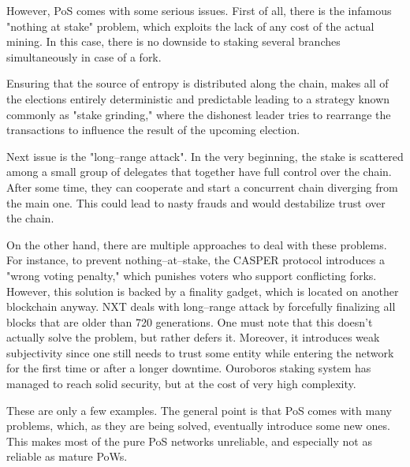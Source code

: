 However, PoS comes with some serious issues. First of all, there is the infamous "nothing at stake"
\cite{pos_flaws_nothing}
problem, which exploits the lack of any cost of the actual mining. In this case,
there is no downside to staking several branches simultaneously in case of a fork.

Ensuring that the source of entropy is distributed along the chain,
makes all of the elections entirely deterministic and predictable leading to a strategy
known commonly as "stake grinding," where the dishonest leader tries to rearrange the
transactions to influence the result of the upcoming election.

Next issue is the "long–range attack"\cite{pos_flaws_long}.
In the very beginning, the stake is scattered among a small
group of delegates that together have full control over the chain. After
some time, they can cooperate and start a concurrent chain diverging from
the main one. This could lead to nasty frauds and would
destabilize trust over the chain.

On the other hand, there are multiple approaches to deal with these problems. For instance,
to prevent nothing–at–stake, the CASPER protocol introduces a "wrong voting
penalty," which punishes
voters who support conflicting forks\cite{casper}.
However, this solution is backed by a finality gadget, which is located on another blockchain
anyway. NXT deals with long–range attack by forcefully
finalizing all blocks that are older than 720 generations\cite{nxt}.
One must note that this doesn't actually solve the problem, but rather defers
it. Moreover, it introduces weak subjectivity since one still needs to trust
some entity while entering the network for the first time or after a longer
downtime. Ouroboros staking system has managed to reach solid security, but
at the cost of very high complexity\cite{ouroboros}.

These are only a few examples. The general point is that PoS comes with many
problems, which, as they are being solved, eventually introduce some new ones. This
makes most of the pure PoS networks unreliable, and especially not as reliable
as mature PoWs.
